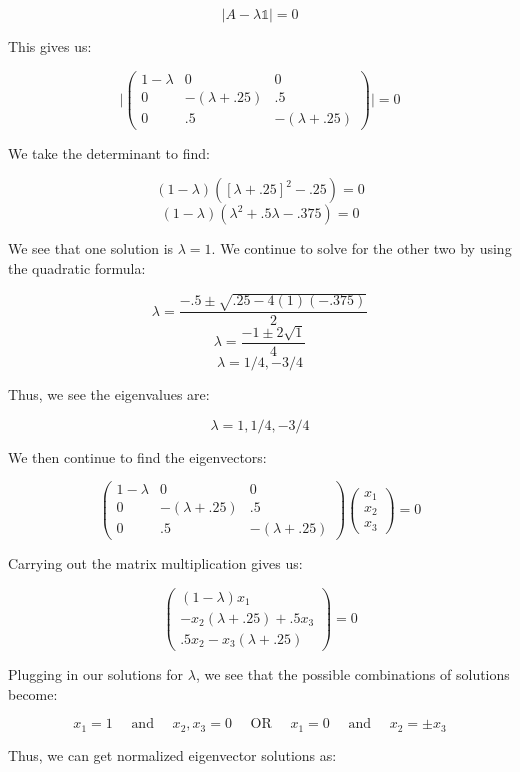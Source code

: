\begin{enumerate}
    $$|A-\lambda\mathbb{1}|=0$$

    This gives us:

    $$\Big|\left( \begin{matrix} 1-\lambda & 0 & 0\\ 0 & -(\lambda+.25) & .5\\ 0 & .5 & -(\lambda+.25)\end{matrix} \right)\Big|=0$$

    We take the determinant to find:

    $$(1-\lambda)\left([\lambda+.25]^2-.25\right)=0$$
    $$(1-\lambda)\left(\lambda^2+.5\lambda-.375\right)=0$$

    We see that one solution is $\lambda=1$. We continue to solve for the other two by using the quadratic formula:

    $$\lambda=\frac{-.5\pm\sqrt{.25-4(1)(-.375)}}{2}$$
    $$\lambda=\frac{-1\pm2\sqrt{1}}{4}$$
    $$\lambda=1/4,-3/4$$

    Thus, we see the eigenvalues are:

    $$\boxed{\lambda=1,1/4,-3/4}$$

    We then continue to find the eigenvectors:

    $$\left( \begin{matrix} 1-\lambda & 0 & 0\\ 0 & -(\lambda+.25) & .5\\ 0 & .5 & -(\lambda+.25)\end{matrix} \right)\left( \begin{matrix}x_1\\x_2\\x_3\end{matrix} \right)=0$$

    Carrying out the matrix multiplication gives us:

    $$\left( \begin{matrix} (1-\lambda)x_1\\ -x_2(\lambda+.25)+.5x_3\\ .5x_2-x_3(\lambda+.25)\end{matrix} \right)=0$$


    Plugging in our solutions for $\lambda$, we see that the possible combinations of solutions become:

    $$x_1=1\quad\text{ and }\quad x_2,x_3=0\quad\text{ OR }\quad x_1=0\quad\text{ and }\quad x_2=\pm x_3$$

    Thus, we can get normalized eigenvector solutions as:


\end{enumerate}
